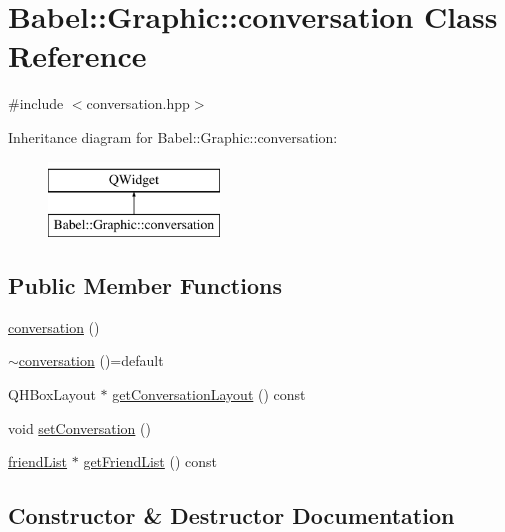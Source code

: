 \hypertarget{classBabel_1_1Graphic_1_1conversation}{}\section{Babel\+:\+:Graphic\+:\+:conversation Class Reference}
\label{classBabel_1_1Graphic_1_1conversation}


{\ttfamily \#include $<$conversation.\+hpp$>$}

Inheritance diagram for Babel\+:\+:Graphic\+:\+:conversation\+:\begin{figure}[H]
\begin{center}
\leavevmode
\includegraphics[height=2.000000cm]{classBabel_1_1Graphic_1_1conversation}
\end{center}
\end{figure}
\subsection*{Public Member Functions}
\begin{DoxyCompactItemize}
\item 
\hyperlink{classBabel_1_1Graphic_1_1conversation_ae26b387a1061fc513e360055c2905be6}{conversation} ()
\item 
\hyperlink{classBabel_1_1Graphic_1_1conversation_a28330c44d43a705369edcb7fb834b6d3}{$\sim$conversation} ()=default
\item 
Q\+H\+Box\+Layout $\ast$ \hyperlink{classBabel_1_1Graphic_1_1conversation_a3a04c3a478032580c2c13d4fe95ee9bf}{get\+Conversation\+Layout} () const
\item 
void \hyperlink{classBabel_1_1Graphic_1_1conversation_aa3bed4252d66d19b2f6d5d328c91ba68}{set\+Conversation} ()
\item 
\hyperlink{classBabel_1_1Graphic_1_1friendList}{friend\+List} $\ast$ \hyperlink{classBabel_1_1Graphic_1_1conversation_a4be86273e32c40d5f4b7a121d5103f44}{get\+Friend\+List} () const
\end{DoxyCompactItemize}


\subsection{Constructor \& Destructor Documentation}
\mbox{\label{classBabel_1_1Graphic_1_1conversation_ae26b387a1061fc513e360055c2905be6}} 
